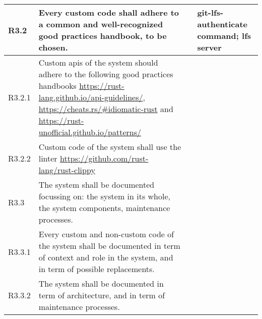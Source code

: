\documentclass[a4paper,11pt]{article}
\begin{document}
\begin{landscape}
\begin{longtable}{|p{1cm}|p{19cm}|p{2cm}|p{3cm}|}
        \rowcolor[HTML]{DDFFDD}        R3.2       & Every custom code shall adhere to a common and well-recognized good practices handbook, to be chosen.                                                                                                                                                                                 &                       & git-lfs-authenticate command; lfs server \\ \hline
        \rowcolor[HTML]{EEFFEE}        R3.2.1     & Custom apis of the system should adhere to the following good practices handbooks \url{https://rust-lang.github.io/api-guidelines/}, \url{https://cheats.rs/#idiomatic-rust} and \url{https://rust-unofficial.github.io/patterns/}                                                    &                       &                                          \\\hline
        \rowcolor[HTML]{EEFFEE}        R3.2.2     & Custom code of the system shall use the linter \url{https://github.com/rust-lang/rust-clippy}                                                                                                                                                                                         &                       &                                          \\\hline
        \rowcolor[HTML]{DDFFDD}        R3.3       & The system shall be documented focussing on: the system in its whole, the system components, maintenance processes.                                                                                                                                                                   &                       &                                          \\ \hline
        \rowcolor[HTML]{EEFFEE}        R3.3.1     & Every custom and non-custom code of the system shall be documented in term of context and role in the system, and in term of possible replacements.                                                                                                                                   &                       &                                          \\\hline
        \rowcolor[HTML]{EEFFEE}        R3.3.2     & The system shall be documented in term of architecture, and in term of maintenance processes.                                                                                                                                                                                         &                       &                                          \\\hline

\end{longtable}
\end{landscape}
\end{document}

